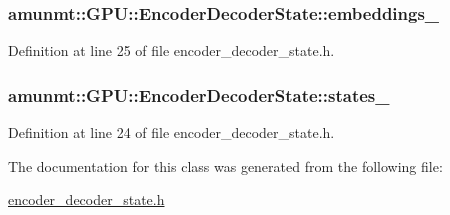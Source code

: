 \subsubsection[{\texorpdfstring{embeddings\+\_\+}{embeddings_}}]{ amunmt\+::\+G\+P\+U\+::\+Encoder\+Decoder\+State\+::embeddings\+\_\+\hspace{0.3cm}{\ttfamily [private]}}\hypertarget{classamunmt_1_1GPU_1_1EncoderDecoderState_ad5194d83c537976e776997f73ac75638}{}\label{classamunmt_1_1GPU_1_1EncoderDecoderState_ad5194d83c537976e776997f73ac75638}


Definition at line 25 of file encoder\+\_\+decoder\+\_\+state.\+h.

\subsubsection[{\texorpdfstring{states\+\_\+}{states_}}]{ amunmt\+::\+G\+P\+U\+::\+Encoder\+Decoder\+State\+::states\+\_\+\hspace{0.3cm}{\ttfamily [private]}}\hypertarget{classamunmt_1_1GPU_1_1EncoderDecoderState_a52459847b8f5d70ed4432d0839d35892}{}\label{classamunmt_1_1GPU_1_1EncoderDecoderState_a52459847b8f5d70ed4432d0839d35892}


Definition at line 24 of file encoder\+\_\+decoder\+\_\+state.\+h.



The documentation for this class was generated from the following file\+:\begin{DoxyCompactItemize}
\item 
\hyperlink{encoder__decoder__state_8h}{encoder\+\_\+decoder\+\_\+state.\+h}\end{DoxyCompactItemize}

